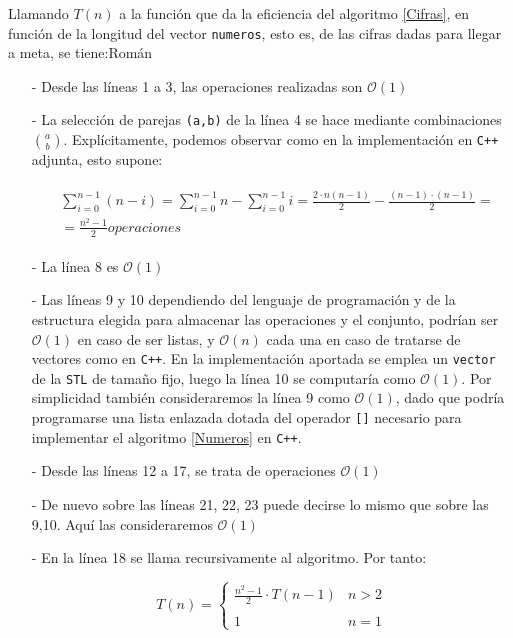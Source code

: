 \documentclass[a4paper,10pt]{scrartcl}
\def\C++#1{\texttt{#1}}
\begin{document}
   Llamando $T(n)$ a la función que da la eficiencia del algoritmo \ref{Cifras},
   en función de la longitud del vector \C++{numeros}, esto es, de las cifras
   dadas para llegar a meta, se tiene:Román
   \begin{itemize} 
    \item [-] Desde las líneas 1 a 3, las operaciones realizadas son $\mathcal{O}(1)$
    \item [-] La selección de parejas \C++{(a,b)} de la línea 4 se hace mediante
    combinaciones ${a \choose b}$. Explícitamente, podemos observar como en
    la implementación en \C++{C++} adjunta, esto supone:
    
    \begin{gather*}
    \begin{split}
        &\sum_{i=0}^{n-1}(n-i)=\sum_{i=0}^{n-1}n-\sum_{i=0}^{n-1}i=
        \frac{2\cdot n(n-1)}{2}-\frac{(n-1)\cdot(n-1)}{2}=\\
        &=\frac{n^2-1}{2}  operaciones 
    \end{split}
    \end{gather*}
        
    \item [-] La línea 8 es $\mathcal{O}(1)$
    \item [-] Las líneas 9 y 10 dependiendo del lenguaje de programación y de
    la estructura elegida para almacenar las operaciones y el conjunto, podrían
    ser $\mathcal{O}(1)$ en caso de ser listas, y $\mathcal{O}(n)$ cada una en
    caso de tratarse de vectores como en \C++{C++}. En la implementación
    aportada se emplea un \C++{vector} de la \C++{STL} de tamaño fijo,
    luego la línea 10 se computaría como $\mathcal{O}(1)$. Por simplicidad
    también consideraremos la línea 9 como $\mathcal{O}(1)$, dado que podría
    programarse una lista enlazada dotada del operador \C++{[]} necesario
    para implementar el algoritmo \ref{Numeros} en \C++{C++}.
    
    \item [-] Desde las líneas 12 a 17, se trata de operaciones $\mathcal{O}(1)$
    \item [-] De nuevo sobre las líneas 21, 22, 23 puede decirse lo mismo que sobre
    las 9,10. Aquí las consideraremos $\mathcal{O}(1)$
    \item [-] En la línea 18 se llama recursivamente al algoritmo. Por tanto:
    
    $$T(n)=\left\{\begin{array}{lr}
                   \frac{n^2-1}{2}\cdot T(n-1) & n>2\\
                   \ \\
                   1 & n=1
                  \end{array}\right.$$
                  

\end{itemize}
\end{document}

